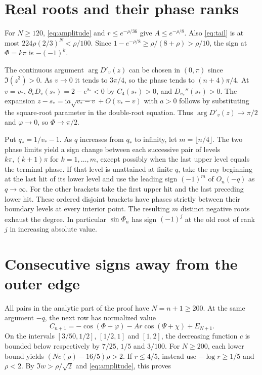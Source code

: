 \documentclass[11pt]{article}
\newcommand{\ii}{\mathrm{i}}
\begin{document}
\section{Real roots and their phase ranks}

For \(N\ge120\), \eqref{eq:amplitude} and \(r\le e^{-\rho/36}\) give \(A\le e^{-\rho/8}\). Also \eqref{eq:tail} is at most \(224\rho(2/3)^N<\rho/100\). Since \(1-e^{-\rho/8}\ge \rho/(8+\rho)>\rho/10\), the sign at \(\Phi=k\pi\) is \(-(-1)^k\).

The continuous argument \(\arg D'_v(z)\) can be chosen in \((0,\pi)\) since \(\Im(z^3)>0\). As \(v\to0\) it tends to \(3\pi/4\), so the phase tends to \((n+4)\pi/4\). At \(v=v_*\), \(\partial_v D_v(s_*)=2-e^{s_*}<0\) by \(C_4(s_*)>0\), and \(D_{v_*}''(s_*)>0\). The expansion \(z-s_*=\ii a\sqrt{v_*-v}+O(v_*-v)\) with \(a>0\) follows by substituting the square-root parameter in the double-root equation. Thus \(\arg D'_v(z)\to\pi/2\) and \(\varphi\to0\), so \(\Phi\to\pi/2\).


Put $q_*=1/v_*-1$. As $q$ increases from $q_*$ to infinity, let $m=\lfloor n/4\rfloor$. The two phase limits yield a sign change between each successive pair of levels $k\pi,(k+1)\pi$ for $k=1,\ldots,m$, except possibly when the last upper level equals the terminal phase. If that level is unattained at finite $q$, take the ray beginning at the last hit of its lower level and use the leading sign $(-1)^m$ of $O_n(-q)$ as $q\to\infty$. For the other brackets take the first upper hit and the last preceding lower hit. These ordered disjoint brackets have phases strictly between their boundary levels at every interior point. The resulting $m$ distinct negative roots exhaust the degree. In particular $\sin\Phi_n$ has sign $(-1)^j$ at the old root of rank $j$ in increasing absolute value.
\section{Consecutive signs away from the outer edge}

All pairs in the analytic part of the proof have \(N=n+1\ge200\). At the same argument \(-q\), the next row has normalized value
\[
C_{n+1}=-\cos(\Phi+\varphi)-Ar\cos(\Psi+\chi)+E_{N+1}.
\]
On the intervals $[3/50,1/2]$, $[1/2,1]$ and $[1,2]$, the decreasing function $c$ is bounded below respectively by $7/25$, $1/5$ and $3/100$. For $N\ge200$, each lower bound yields $(Nc(\rho)-16/5)\rho>2$. If $r\le4/5$, instead use $-\log r\ge1/5$ and $\rho<2$. By $\Im w>\rho/\sqrt2$ and \eqref{eq:amplitude}, this proves
\end{document}
